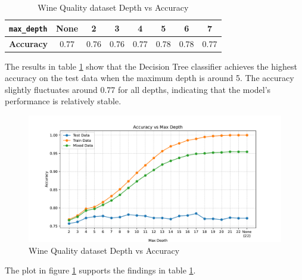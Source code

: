 
\begin{table}[H]
    \centering
    \begin{tabular}{|l|c|c|c|c|c|c|c|}
        \hline
        \textbf{\texttt{max\_depth}} & None & 2 & 3 & 4 & 5 & 6 & 7 \\ \hline
        \textbf{Accuracy} & 0.77 & 0.76 & 0.76 & 0.77 & 0.78 & 0.78 & 0.77 \\ \hline
    \end{tabular}
    \caption{Wine Quality dataset Depth vs Accuracy}
    \label{tab:wine_quality_depth_vs_accuracy}
\end{table}

The results in table \ref{tab:wine_quality_depth_vs_accuracy} show that the Decision Tree classifier achieves the highest accuracy on the test data when the maximum depth is around 5. The accuracy slightly fluctuates around 0.77 for all depths, indicating that the model's performance is relatively stable.

\begin{figure}[H]
    \centering
    \includegraphics[width=\textwidth]{figures/wine_quality_accuracy_vs_max_depth.pdf}
    \caption{Wine Quality dataset Depth vs Accuracy}
    \label{fig:wine_quality_accuracy_vs_max_depth}
\end{figure}

The plot in figure \ref{fig:wine_quality_accuracy_vs_max_depth} supports the findings in table \ref{tab:wine_quality_depth_vs_accuracy}.

